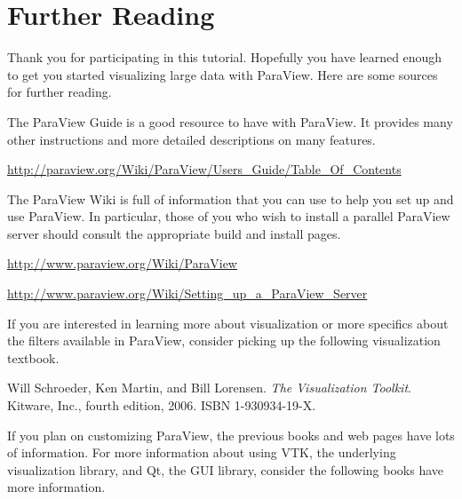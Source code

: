 \chapter{Further Reading}
\label{chap:FurtherReading}

Thank you for participating in this tutorial.  Hopefully you have learned
enough to get you started visualizing large data with ParaView.  Here are
some sources for further reading.

The ParaView Guide is a good resource to have with ParaView.  It provides
many other instructions and more detailed descriptions on many features.

\begin{reflist}
\item \href{http://paraview.org/Wiki/ParaView/Users_Guide/Table_Of_Contents}{http://paraview.org/Wiki/ParaView/Users\_Guide/Table\_Of\_Contents}
\end{reflist}

The ParaView Wiki is full of information that you can use to help you set
up and use ParaView.  In particular, those of you who wish to install a
parallel ParaView server should consult the appropriate build and install
pages.

\begin{reflist}
\item \href{http://www.paraview.org/Wiki/ParaView}{http://www.paraview.org/Wiki/ParaView}
\item \href{http://www.paraview.org/Wiki/Setting_up_a_ParaView_Server}{http://www.paraview.org/Wiki/Setting\_up\_a\_ParaView\_Server}
\end{reflist}

If you are interested in learning more about visualization or more
specifics about the filters available in ParaView, consider picking up the
following visualization textbook.

\begin{reflist}
\item Will Schroeder, Ken Martin, and Bill Lorensen.  \emph{The
  Visualization Toolkit}.  Kitware, Inc., fourth edition, 2006.  ISBN
  1-930934-19-X.
\end{reflist}

If you plan on customizing ParaView, the previous books and web pages have
lots of information.  For more information about using VTK, the underlying
visualization library, and Qt, the GUI library, consider the following
books have more information.

